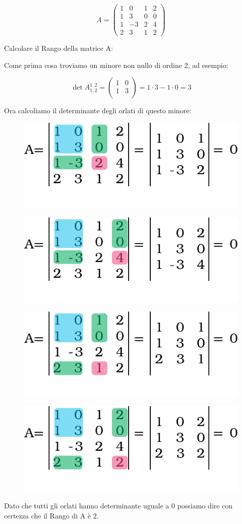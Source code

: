 \begin{esercizio}
  $$
  A=
  \begin{pmatrix}
    1 &  0 & 1 & 2\\
    1 &  3 & 0 & 0\\
    1 & -3 & 2 & 4\\
    2 &  3 & 1 & 2
  \end{pmatrix}
  $$

  Calcolare il Rango della matrice A:

  Come prima cosa troviamo un minore non nullo di ordine 2, ad esempio:

  $$
  \det A_{1,2}^{1,2}=
  \begin{pmatrix}
    1 &  0\\
    1 &  3\\
  \end{pmatrix}=1\cdot 3-1\cdot 0=3
  $$

  Ora calcoliamo il determinante degli orlati di questo minore:

  \begin{figure}[H]
    \centering
    \includegraphics[height=0.16\textwidth]{Figures/orlati_es_1.pdf}
  \end{figure}

  \begin{figure}[H]
    \centering
    \includegraphics[height=0.16\textwidth]{Figures/orlati_es_2.pdf}
  \end{figure}

  \begin{figure}[H]
    \centering
    \includegraphics[height=0.16\textwidth]{Figures/orlati_es_3.pdf}
  \end{figure}

  \begin{figure}[H]
    \centering
    \includegraphics[height=0.16\textwidth]{Figures/orlati_es_4.pdf}
  \end{figure}

  Dato che tutti gli orlati hanno determinante uguale a 0 possiamo
  dire con certezza che il Rango di A è 2.
\end{esercizio}

